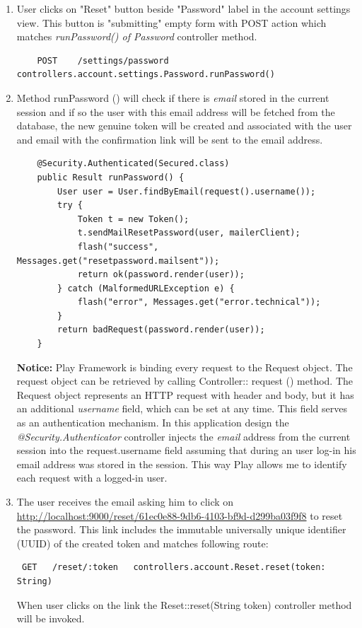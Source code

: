 \documentclass[12pt,twoside,a4paper]{report}
\begin{document}
\begin{enumerate}\itemsep1pt \parskip0pt 

\item User clicks on "Reset" button beside "Password" label in the account settings view. This button is "submitting" empty form with POST action which matches \emph{runPassword() of Password} controller method.
	\begin{lstlisting}
	POST    /settings/password   controllers.account.settings.Password.runPassword()
	\end{lstlisting}
	
	\item Method runPassword () will check if there is \emph{email} stored in the current session and if so the user with this email address will be fetched from the database, the new genuine token will be created and associated with the user and email with the confirmation link will be sent to the email address.
\begin{lstlisting}
	@Security.Authenticated(Secured.class)
    public Result runPassword() {
        User user = User.findByEmail(request().username());
        try {
            Token t = new Token();
            t.sendMailResetPassword(user, mailerClient);
            flash("success", Messages.get("resetpassword.mailsent"));
            return ok(password.render(user));
        } catch (MalformedURLException e) {
            flash("error", Messages.get("error.technical"));
        }
        return badRequest(password.render(user));
    }
\end{lstlisting}
\textbf{Notice:} Play Framework is binding every request to the Request object. The request object can be retrieved by calling Controller:: request () method. The Request object represents an HTTP request with header and body, but it has an additional \emph{username} field, which can be set at any time. This field serves as an authentication mechanism. In this application design the \emph{@Security.Authenticator} controller injects the \emph{email} address from the current session into the request.username field assuming that during an user log-in his email address was stored in the session. This way Play allows me to identify each request with a logged-in user.

\item The user receives the email asking him to click on \url{ http://localhost:9000/reset/61ec0e88-9db6-4103-bf9d-d299ba03f9f8} to reset the password. This link includes the immutable universally unique identifier (UUID) of the created token and matches following route:
\begin{lstlisting}
 GET   /reset/:token   controllers.account.Reset.reset(token: String)
\end{lstlisting}
When user clicks on the link the Reset::reset(String token) controller method will be invoked.


\end{enumerate}
\end{document}
